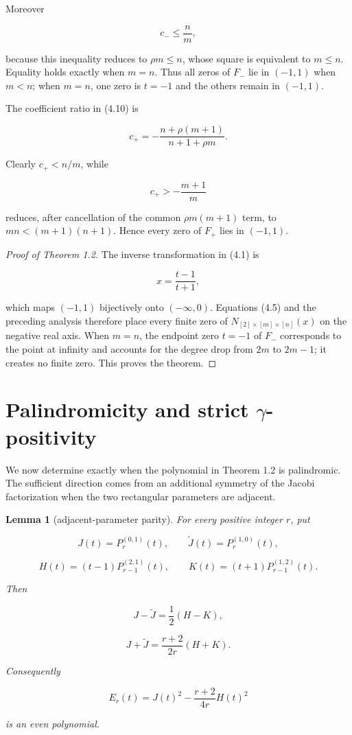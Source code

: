 \documentclass[11pt]{article}
\newtheorem{lemma}[theorem]{Lemma}
\numberwithin{equation}{section}
\begin{document}
Moreover

\nopagebreak[4]
\[
c_-\leq\frac nm,
\]

because this inequality reduces to $\rho m\leq n$, whose square is equivalent
to $m\leq n$. Equality holds exactly when $m=n$. Thus all zeros of $F_-$ lie
in $(-1,1)$ when $m<n$; when $m=n$, one zero is $t=-1$ and the others remain
in $(-1,1)$.

The coefficient ratio in (4.10) is

\nopagebreak[4]
\[
c_+=-
\frac{n+\rho(m+1)}{n+1+\rho m}.
\tag{4.13}
\]

Clearly $c_+<n/m$, while

\nopagebreak[4]
\[
c_+>-\frac{m+1}{m}
\]

reduces, after cancellation of the common $\rho m(m+1)$ term, to
$mn<(m+1)(n+1)$. Hence every zero of $F_+$ lies in $(-1,1)$.

\begin{proof}[Proof of Theorem 1.2]

The inverse transformation in (4.1) is

\nopagebreak[4]
\[
x=\frac{t-1}{t+1},
\]

which maps $(-1,1)$ bijectively onto $(-\infty,0)$. Equations (4.5) and the
preceding analysis therefore place every finite zero of
$N_{[2]\times[m]\times[n]}(x)$ on the negative real axis. When $m=n$, the
endpoint zero $t=-1$ of $F_-$ corresponds to the point at infinity and accounts
for the degree drop from $2m$ to $2m-1$; it creates no finite zero. This proves
the theorem.
\end{proof}


\section{Palindromicity and strict \texorpdfstring{$\gamma$}{gamma}-positivity}


We now determine exactly when the polynomial in Theorem 1.2 is palindromic.
The sufficient direction comes from an additional symmetry of the Jacobi
factorization when the two rectangular parameters are adjacent.

\Needspace{0.30\textheight}
\begin{lemma}[adjacent-parameter parity]

For every positive integer $r$, put

\nopagebreak[4]
\[
J(t)=P_r^{(0,1)}(t),\qquad
\widetilde J(t)=P_r^{(1,0)}(t),
\]

\nopagebreak[4]
\[
H(t)=(t-1)P_{r-1}^{(2,1)}(t),\qquad
K(t)=(t+1)P_{r-1}^{(1,2)}(t).
\]

Then

\nopagebreak[4]
\[
J-\widetilde J=\frac12(H-K),
\tag{5.1}
\]

\nopagebreak[4]
\[
J+\widetilde J=\frac{r+2}{2r}(H+K).
\tag{5.2}
\]

Consequently

\nopagebreak[4]
\[
E_r(t)=J(t)^2-\frac{r+2}{4r}H(t)^2
\tag{5.3}
\]

is an even polynomial.

\end{lemma}
\end{document}
